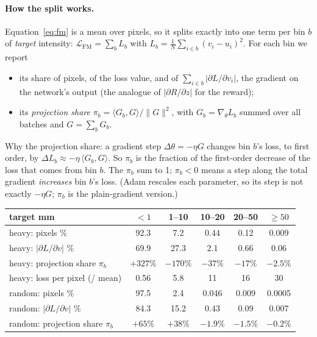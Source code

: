 \documentclass[11pt,a4paper]{article}
\begin{document}
\paragraph{How the split works.} Equation~\eqref{eq:fm} is a mean over pixels, so it splits exactly into one term per
bin $b$ of \emph{target} intensity: $\mathcal L_{\mathrm{FM}} = \sum_b L_b$ with
$L_b = \frac1N\sum_{i\in b}(v_i - u_i)^2$. For each bin we report
\begin{itemize}[nosep]
\item its share of pixels, of the loss value, and of $\sum_{i\in b}|\partial L/\partial v_i|$, the gradient on the
network's output (the analogue of $|\partial R/\partial z|$ for the reward);
\item its \emph{projection share} $\pi_b = \langle G_b, G\rangle/\|G\|^2$, with $G_b = \nabla_\theta L_b$ summed over all
batches and $G = \sum_b G_b$.
\end{itemize}
Why the projection share: a gradient step $\Delta\theta = -\eta G$ changes bin $b$'s loss, to first order, by
$\Delta L_b \approx -\eta\,\langle G_b, G\rangle$. So $\pi_b$ is the fraction of the first-order decrease of the loss that
comes from bin $b$. The $\pi_b$ sum to 1; $\pi_b < 0$ means a step along the total gradient \emph{increases} bin $b$'s
loss. (Adam rescales each parameter, so its step is not exactly $-\eta G$; $\pi_b$ is the plain-gradient version.)

\begin{center}\small\begin{tabular}{lccccc}\toprule
target mm & $<1$ & 1--10 & 10--20 & 20--50 & $\ge50$\\\midrule
heavy: pixels \% & 92.3 & 7.2 & 0.44 & 0.12 & 0.009\\
heavy: $|\partial L/\partial v|$ \% & 69.9 & 27.3 & 2.1 & 0.66 & 0.06\\
heavy: projection share $\pi_b$ & $+327\%$ & $-170\%$ & $-37\%$ & $-17\%$ & $-2.5\%$\\
heavy: loss per pixel (/ mean) & 0.56 & 5.8 & 11 & 16 & 30\\\midrule
random: pixels \% & 97.5 & 2.4 & 0.046 & 0.009 & 0.0005\\
random: $|\partial L/\partial v|$ \% & 84.3 & 15.2 & 0.43 & 0.09 & 0.007\\
random: projection share $\pi_b$ & $+65\%$ & $+38\%$ & $-1.9\%$ & $-1.5\%$ & $-0.2\%$\\\bottomrule
\end{tabular}\end{center}
\end{document}
